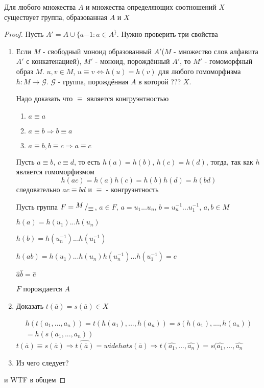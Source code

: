 \documentclass[../main/document.tex]{subfiles}
\begin{document}
\begin{thm}
Для любого множества $A$ и множества определяющих соотношений $X$ существует группа, образованная $A$ и $X$
\begin{proof}
Пусть $A'=A\cup\{a{-1}:a\in A^\}$. Нужно проверить три свойства
\begin{enumerate}
\item Если $M$ - свободный моноид образованный $A'$($M$ - множество слов алфавита $A'$ с конкатенацией), $M'$ - моноид, порождённый $A'$, то $M'$ - гомоморфный образ $M$. $u,v\in M$, $u\equiv v\Leftrightarrow h(u)=h(v)$ для любого гомоморфизма $h:M\rightarrow \mathcal{G}$. $\mathcal{G}$ - группа, порождённая $A$ в которой ??? $X$.

Надо доказать что $\equiv$ является конгруэнтностью
\begin{enumerate}
\item $a\equiv a$
\item $a\equiv b\Rightarrow b\equiv a$
\item $a\equiv b, b\equiv c\Rightarrow a\equiv c$
\end{enumerate}
Пусть $a\equiv b$, $c\equiv d$, то есть $h(a)=h(b)$, $h(c)=h(d)$, тогда, так как $h$  является гомоморфизмом
$$h(ac)=h(a)h(c)=h(b)h(d)=h(bd)$$
следовательно $ac\equiv bd$ и $\equiv$ - конгруэнтность

Пусть группа $F=\bigslant{M}{\equiv}$, $\widehat{a}\in F$, $a=u_1...u_n$, $b=u_n^{-1}...u_1^{-1}$, $a,b\in M$

$h(a)=h(u_1)...h(u_n)$

$h(b)=h(u_n^{-1})...h(u_1^{-1})$

$h(ab)=h(u_1)...h(u_n)h(u_n^{-1})...h(u_1^{-1})=e$

$\widehat{a}\widehat{b}=\widehat{e}$

$F$ порождается $A$
\item Доказать $t(\overline{a})=s(\overline{a})\in X$

\begin{multline*}
h(t(a_1,...,a_n))=t(h(a_1),...,h(a_n))=s(h(a_1),...,h(a_n))\\
=h(s(a_1,...,a_n))
\end{multline*}
$t(\overline{a})\equiv s(\overline{a})\Rightarrow \widehat{t(\overline{a})}=widehat{s(\overline{a})}\Rightarrow t(\widehat{a_1},...,\widehat{a_n})=s(\widehat{a_1},...,\widehat{a_n}$
\item Из чего следует?
\end{enumerate}
и WTF в общем
\end{proof}
\end{thm}
\end{document}
